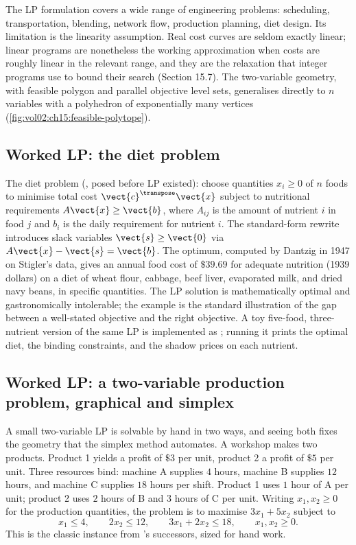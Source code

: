 The LP formulation covers a wide range of engineering
problems: scheduling, transportation, blending, network flow,
production planning, diet design. Its limitation is the
linearity assumption. Real cost curves are seldom exactly linear;
linear programs are nonetheless the working approximation when
costs are roughly linear in the relevant range, and they are the
relaxation that integer programs use to bound their search
(Section 15.7). The two-variable geometry, with feasible polygon
and parallel objective level sets, generalises directly to $n$
variables with a polyhedron of exponentially many vertices
(\cref{fig:vol02:ch15:feasible-polytope}).



\subsection{Worked LP: the diet problem}

The diet problem (\textcite{text:v2ch15-stigler1945}, posed before
LP existed): choose quantities $x_{i} \geq 0$ of $n$ foods to
minimise total cost $\vect{c}^{\transpose} \vect{x}$ subject to
nutritional requirements $A \vect{x} \geq \vect{b}$, where $A_{ij}$
is the amount of nutrient $i$ in food $j$ and $b_{i}$ is the daily
requirement for nutrient $i$. The standard-form rewrite
introduces slack variables $\vect{s} \geq \vect{0}$ via $A
\vect{x} - \vect{s} = \vect{b}$. The optimum, computed by Dantzig
in 1947 on Stigler's data, gives an annual food cost of $\$39.69$
for adequate nutrition (1939 dollars) on a diet of wheat flour,
cabbage, beef liver, evaporated milk, and dried navy beans, in
specific quantities. The LP solution is mathematically optimal
and gastronomically intolerable; the example is the standard
illustration of the gap between a well-stated objective and the
right objective. A toy five-food, three-nutrient version of the
same LP is implemented as
;
running it prints the optimal diet, the binding constraints, and
the shadow prices on each nutrient.

\subsection{Worked LP: a two-variable production problem, graphical
and simplex}

A small two-variable LP is solvable by hand in two ways, and
seeing both fixes the geometry that the simplex method automates.
A workshop makes two products. Product 1 yields a profit of
$\$3$ per unit, product 2 a profit of $\$5$ per unit. Three
resources bind: machine A supplies $4$ hours, machine B supplies
$12$ hours, and machine C supplies $18$ hours per shift. Product 1
uses $1$ hour of A per unit; product 2 uses $2$ hours of B and $3$
hours of C per unit. Writing $x_{1}, x_{2} \geq 0$ for the
production quantities, the problem is to maximise $3 x_{1} + 5
x_{2}$ subject to
\[
x_{1} \leq 4, \qquad 2 x_{2} \leq 12, \qquad
3 x_{1} + 2 x_{2} \leq 18, \qquad x_{1}, x_{2} \geq 0.
\]
This is the classic instance from \textcite{text:v2ch15-dantzig1947}'s
successors, sized for hand work.

